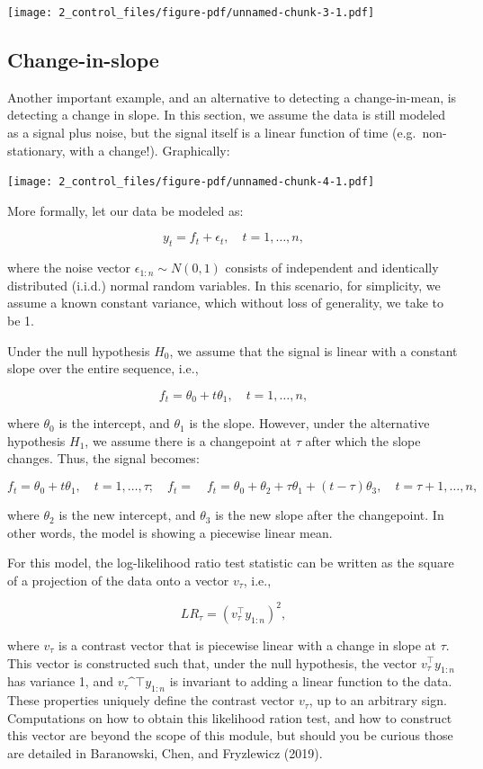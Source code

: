 \documentclass[
  letterpaper,
  DIV=11,
  numbers=noendperiod]{scrreprt}
\begin{document}
\texttt{[image: 2\_control\_files/figure-pdf/unnamed-chunk-3-1.pdf]}

\subsection{Change-in-slope}\label{change-in-slope}

Another important example, and an alternative to detecting a
change-in-mean, is detecting a change in slope. In this section, we
assume the data is still modeled as a signal plus noise, but the signal
itself is a linear function of time (e.g.~non-stationary, with a
change!). Graphically:

\texttt{[image: 2\_control\_files/figure-pdf/unnamed-chunk-4-1.pdf]}

More formally, let our data be modeled as:

\[
y_t = f_t + \epsilon_t, \quad t = 1, \dots, n,
\]

where the noise vector \(\epsilon_{1:n} \sim N(0, 1)\) consists of
independent and identically distributed (i.i.d.) normal random
variables. In this scenario, for simplicity, we assume a known constant
variance, which without loss of generality, we take to be 1.

Under the null hypothesis \(H_0\), we assume that the signal is linear
with a constant slope over the entire sequence, i.e.,

\[
f_t = \theta_0 + t\theta_1, \quad t = 1, \dots, n,
\]

where \(\theta_0\) is the intercept, and \(\theta_1\) is the slope.
However, under the alternative hypothesis \(H_1\), we assume there is a
changepoint at \(\tau\) after which the slope changes. Thus, the signal
becomes:

\[
f_t = \theta_0 + t\theta_1, \quad t = 1, \dots, \tau; \quad f_t = \quad f_t = \theta_0 + \theta_2 + \tau \theta_1 + (t-\tau)\theta_3, \quad t = \tau+1, \dots, n,
\]

where \(\theta_2\) is the new intercept, and \(\theta_3\) is the new
slope after the changepoint. In other words, the model is showing a
piecewise linear mean.

For this model, the log-likelihood ratio test statistic can be written
as the square of a projection of the data onto a vector \(v_\tau\),
i.e.,

\[
LR_\tau = \left( v_\tau^\top y_{1:n} \right)^2,
\]

where \(v_\tau\) is a contrast vector that is piecewise linear with a
change in slope at \(\tau\). This vector is constructed such that, under
the null hypothesis, the vector \(v_\tau^\top y_{1:n}\) has variance 1,
and \(v_\tau\^\top y_{1:n}\) is invariant to adding a linear function to
the data. These properties uniquely define the contrast vector
\(v_\tau\), up to an arbitrary sign. Computations on how to obtain this
likelihood ration test, and how to construct this vector are beyond the
scope of this module, but should you be curious those are detailed in
Baranowski, Chen, and Fryzlewicz (2019).
\end{document}
